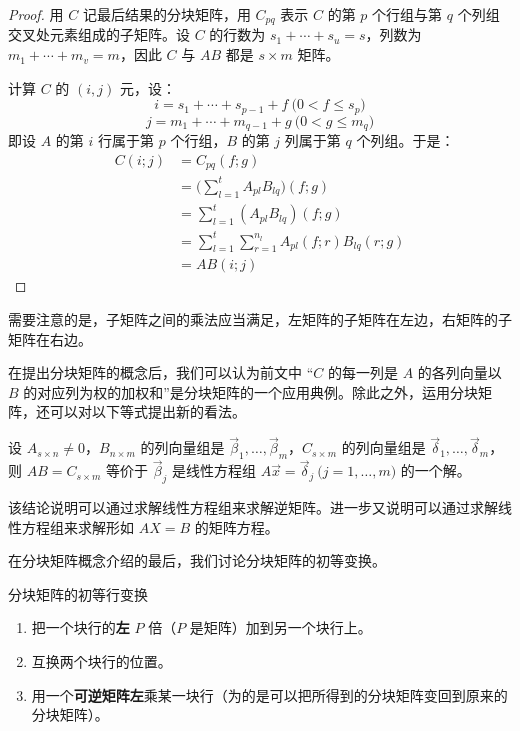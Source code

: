 \begin{proof}
	用 $C$ 记最后结果的分块矩阵，用 $C_{pq}$ 表示 $C$ 的第 $p$ 个行组与第 $q$ 个列组交叉处元素组成的子矩阵。设 $C$ 的行数为 $s_1 + \cdots + s_u = s$，列数为 $m_1 + \cdots + m_v = m$，因此 $C$ 与 $AB$ 都是 $s \times m$ 矩阵。

	计算 $C$ 的 $(i, j)$ 元，设：
	$$
	i = s_1 + \cdots + s_{p - 1} + f \pod{0 < f \le s_p}
	$$$$
	j = m_1 + \cdots + m_{q - 1} + g \pod{0 < g \le m_q}
	$$
	即设 $A$ 的第 $i$ 行属于第 $p$ 个行组，$B$ 的第 $j$ 列属于第 $q$ 个列组。于是：
	$$
	\begin{aligned}
		C(i; j) &= C_{pq}(f;g)
		\\&=
		\biggl( \sum\limits_{l = 1}^t A_{pl} B_{lq} \biggr) (f; g)
		\\&=
		\sum\limits_{l = 1}^t (A_{pl} B_{lq}) (f; g)
		\\&=
		\sum\limits_{l = 1}^t \sum\limits_{r = 1}^{n_l} A_{pl}(f; r) B_{lq}(r;g)
		\\&=
		AB(i; j)
	\end{aligned}
	$$
\end{proof}

需要注意的是，子矩阵之间的乘法应当满足，左矩阵的子矩阵在左边，右矩阵的子矩阵在右边。

\bigskip

在提出分块矩阵的概念后，我们可以认为前文中 “$C$ 的每一列是 $A$ 的各列向量以 $B$ 的对应列为权的加权和”是分块矩阵的一个应用典例。除此之外，运用分块矩阵，还可以对以下等式提出新的看法。

\begin{theorem}
	设 $A_{s \times n} \ne 0$，$B_{n \times m}$ 的列向量组是 $\vec \beta_1, \ldots, \vec \beta_m$，$C_{s \times m}$ 的列向量组是 $\vec \delta_1, \ldots, \vec \delta_m$，则 $AB = C_{s \times m}$ 等价于 $\vec \beta_j$ 是线性方程组 $A\vec x = \vec \delta_j \pod{j = 1, \ldots, m}$ 的一个解。
\end{theorem}

该结论说明可以通过求解线性方程组来求解逆矩阵。进一步又说明可以通过求解线性方程组来求解形如 $AX = B$ 的矩阵方程。

\bigskip

在分块矩阵概念介绍的最后，我们讨论分块矩阵的初等变换。

\begin{definition}{分块矩阵的初等行变换}
	\begin{enumerate}
		\item 把一个块行的\textbf{左} $P$ 倍（$P$ 是矩阵）加到另一个块行上。
		\item 互换两个块行的位置。
		\item 用一个\textbf{可逆矩阵左}乘某一块行（为的是可以把所得到的分块矩阵变回到原来的分块矩阵）。
	\end{enumerate}
\end{definition}


